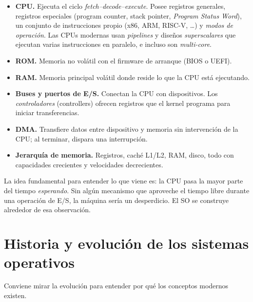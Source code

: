 \documentclass[11pt,a4paper]{article}
\begin{document}
\begin{itemize}[leftmargin=*]
    \item \textbf{CPU.} Ejecuta el ciclo
        \emph{fetch--decode--execute}. Posee registros generales,
        registros especiales (program counter, stack pointer,
        \emph{Program Status Word}), un conjunto de instrucciones
        propio (x86, ARM, RISC-V, \ldots) y \emph{modos de operación}.
        Las CPUs modernas usan \emph{pipelines} y diseños
        \emph{superscalares} que ejecutan varias instrucciones en
        paralelo, e incluso son \emph{multi-core}.
    \item \textbf{ROM.} Memoria no volátil con el firmware de arranque
        (BIOS o UEFI).
    \item \textbf{RAM.} Memoria principal volátil donde reside lo que la
        CPU está ejecutando.
    \item \textbf{Buses y puertos de E/S.} Conectan la CPU con
        dispositivos. Los \emph{controladores} (controllers) ofrecen
        registros que el kernel programa para iniciar transferencias.
    \item \textbf{DMA.} Transfiere datos entre dispositivo y memoria sin
        intervención de la CPU; al terminar, dispara una interrupción.
    \item \textbf{Jerarquía de memoria.} Registros, caché L1/L2, RAM,
        disco, todo con capacidades crecientes y velocidades
        decrecientes.
\end{itemize}

\begin{idea}
La idea fundamental para entender lo que viene es: la CPU pasa la mayor
parte del tiempo \emph{esperando}. Sin algún mecanismo que aproveche el
tiempo libre durante una operación de E/S, la máquina sería un
desperdicio. El SO se construye alrededor de esa observación.
\end{idea}

\section{Historia y evolución de los sistemas operativos}

Conviene mirar la evolución para entender por qué los conceptos modernos
existen.
\end{document}
